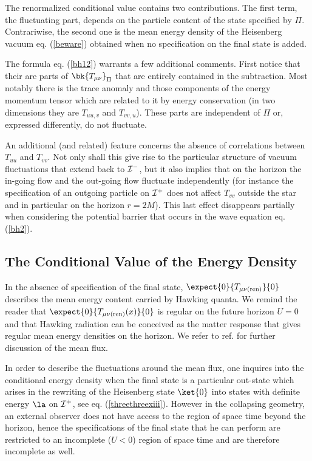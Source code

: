 \documentclass[12pt]{article}
\begin{document}
The renormalized conditional value contains two contributions.
The first term, the fluctuating part, depends on the particle content of the
state specified by $\Pi$. Contrariwise,  the second one is the
mean energy density of the
Heisenberg vacuum
eq. (\ref{beware}) obtained when no specification on the final state is added.

The formula eq. (\ref{bh12})
 warrants a few additional comments. First notice that their are
parts of $\bk{T_{\mu\nu}}_{\Pi}$
that are
entirely contained in the subtraction.
Most notably there is the trace anomaly and those components of the
energy
momentum tensor which are related to it by energy conservation
(in two dimensions they are $T_{uu,v}$ and $T_{vv,u}$). These parts
are
independent of $\Pi$ or, expressed differently, do not
fluctuate.

An additional (and related)  feature
concerns the absence of correlations between $T_{uu}$ and $T_{vv}$.
Not only shall this give rise to the particular structure of vacuum
fluctuations that extend back to ${\cal I}^-$, but it also implies that on the
horizon the in-going flow and the out-going flow fluctuate independently (for
instance the specification of an outgoing particle on ${\cal I}^+$ does not
affect $T_{vv}$ outside the star and in particular
 on the horizon $r=2M$). This last effect disappears partially
when considering the potential barrier that occurs in the wave equation
eq. (\ref{bh2}).

\subsection{The Conditional Value of the Energy Density}\label{bbb}

In the absence of specification of the final state, $\expect{0}{T_{\mu \nu
({\rm ren})}}{0}$ describes the mean energy content carried by Hawking
quanta. We  remind the reader that $\expect{0}{T_{\mu \nu
({\rm ren})} (x)}{0}$ is regular on the future horizon $U=0$ and that
Hawking radiation can be conceived as the matter
response  that gives regular mean energy densities on the horizon.
 We refer to ref. \cite{birreld} for further discussion of the mean flux.




In order to describe the fluctuations around the mean flux, one inquires
into the conditional energy density when the final state is a particular
out-state which arises in the rewriting of the Heisenberg state $\ket{0}$ into
states with definite energy $\la$ on $\cal{I}^+$,
see eq. (\ref{threethreexiii}).
However in the collapsing geometry,
an external observer does not have access to the region of space time
beyond  the horizon, hence the specifications of the final state
that he can perform are
restricted to an incomplete ($U<0$) region of space time and are therefore
incomplete as well.
\end{document}
